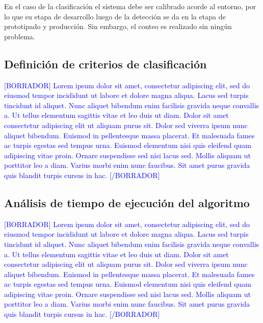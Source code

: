 En el caso de la clasificación el sistema debe ser calibrado acorde al entorno, por lo que su etapa de desarrollo luego de la detección se da en la etapa de prototipado y producción. Sin embargo, el conteo es realizado sin ningún problema.

\subsection{Definición de criterios de clasificación}

\textcolor{blue}{[BORRADOR] Lorem ipsum dolor sit amet, consectetur adipiscing elit, sed do eiusmod tempor incididunt ut labore et dolore magna aliqua. Lacus sed turpis tincidunt id aliquet. Nunc aliquet bibendum enim facilisis gravida neque convallis a. Ut tellus elementum sagittis vitae et leo duis ut diam. Dolor sit amet consectetur adipiscing elit ut aliquam purus sit. Dolor sed viverra ipsum nunc aliquet bibendum. Euismod in pellentesque massa placerat. Et malesuada fames ac turpis egestas sed tempus urna. Euismod elementum nisi quis eleifend quam adipiscing vitae proin. Ornare suspendisse sed nisi lacus sed. Mollis aliquam ut porttitor leo a diam. Varius morbi enim nunc faucibus. Sit amet purus gravida quis blandit turpis cursus in hac. [/BORRADOR]} 

\subsection{Análisis de tiempo de ejecución del algoritmo}

\textcolor{blue}{[BORRADOR] Lorem ipsum dolor sit amet, consectetur adipiscing elit, sed do eiusmod tempor incididunt ut labore et dolore magna aliqua. Lacus sed turpis tincidunt id aliquet. Nunc aliquet bibendum enim facilisis gravida neque convallis a. Ut tellus elementum sagittis vitae et leo duis ut diam. Dolor sit amet consectetur adipiscing elit ut aliquam purus sit. Dolor sed viverra ipsum nunc aliquet bibendum. Euismod in pellentesque massa placerat. Et malesuada fames ac turpis egestas sed tempus urna. Euismod elementum nisi quis eleifend quam adipiscing vitae proin. Ornare suspendisse sed nisi lacus sed. Mollis aliquam ut porttitor leo a diam. Varius morbi enim nunc faucibus. Sit amet purus gravida quis blandit turpis cursus in hac. [/BORRADOR]} 


